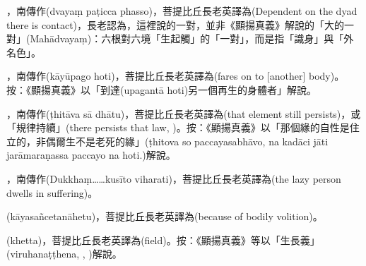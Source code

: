 \startitemgroup[noteitems]
\item{}，南傳作(dvayaṃ paṭicca phasso)，菩提比丘長老英譯為(Dependent on the dyad there is contact)，長老認為，這裡說的一對，並非《顯揚真義》解說的「大的一對」(Mahādvayaṃ)：六根對六境「生起觸」的「一對」，而是指「識身」與「外名色」。
\stopitemgroup

\startitemgroup[noteitems]
\item{}，南傳作(kāyūpago hoti)，菩提比丘長老英譯為(fares on to [another] body)。按：《顯揚真義》以「到達(upagantā hoti)另一個再生的身體者」解說。
\stopitemgroup

\startitemgroup[noteitems]
\item{}，南傳作(ṭhitāva sā dhātu)，菩提比丘長老英譯為(that element still persists)，或「規律持續」(there persists that law, )。按：《顯揚真義》以「那個緣的自性是住立的，非偶爾生不是老死的緣」(ṭhitova so paccayasabhāvo, na kadāci jāti jarāmaraṇassa paccayo na hoti.)解說。
\stopitemgroup

\startitemgroup[noteitems]
\item{}，南傳作(Dukkhaṃ……kusīto viharati)，菩提比丘長老英譯為(the lazy person dwells in suffering)。
\stopitemgroup

\startitemgroup[noteitems]
\item{}(kāyasañcetanāhetu)，菩提比丘長老英譯為(because of bodily volition)。
\stopitemgroup

\startitemgroup[noteitems]
\item{}(khetta)，菩提比丘長老英譯為(field)。按：《顯揚真義》等以「生長義」(viruhanaṭṭhena, , )解說。
\stopitemgroup

